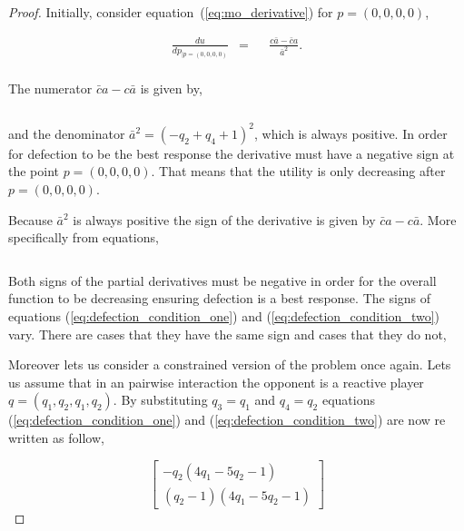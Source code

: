 \begin{proof}
Initially, consider equation~(\ref{eq:mo_derivative}) for \(p = (0, 0, 0,
0)\),

\begin{equation}\label{eq:derivative_of_quadratic_zero}
    \begin{aligned}
     \frac{du}{dp_{| p=(0, 0, 0, 0)}} & = && \frac{c \bar{a} - \bar{c}a}
      {\bar{a}^2} .\\
    \end{aligned}
\end{equation}

The numerator \(\bar{c}a - c\bar{a}\) is given by,

\[\]

and the denominator \(\bar{a} ^ 2 = (-q_2 + q_4 + 1) ^ 2\), which is always positive. In order
for defection to be the best response the derivative must have a negative
sign at the point \(p = (0, 0, 0, 0)\). That means that the utility is only
decreasing after \(p = (0, 0, 0, 0)\).

Because \(\bar{a} ^ 2\) is always positive the sign of the derivative is given by \(\bar{c}a - c\bar{a}\).
More specifically from equations,

\begin{equation}\label{eq:defection_condition_one}
    
\end{equation}
\begin{equation}\label{eq:defection_condition_two}
    
\end{equation}

Both signs of the partial derivatives must be negative in order for the overall
function to be decreasing ensuring defection is a best response.
The signs of equations (\ref{eq:defection_condition_one}) and (\ref{eq:defection_condition_two})
vary. There are cases that they have the same sign and cases that they do not,

Moreover lets us consider a constrained version of the problem once again. Lets us
assume that in an pairwise interaction the opponent is a reactive player \(q=(q_1, q_2, q_1, q_2)\).
By substituting \(q_3=q_1\) and \(q_4=q_2\) equations (\ref{eq:defection_condition_one})
and (\ref{eq:defection_condition_two}) are now re written as follow,

\[\left[\begin{matrix}- q_{2} \left(4 q_{1} - 5 q_{2} - 1\right)\\
\left(q_{2} - 1\right) \left(4 q_{1} - 5 q_{2} - 1\right)\end{matrix}\right]\]

\end{proof}

